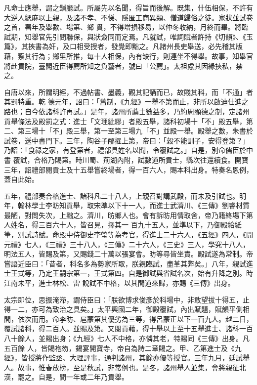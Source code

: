 \begin{pinyinscope}
 凡命士應舉，謂之鎖廳試。所屬先以名聞，得旨而後解。既集，什伍相保，不許有大逆人緦麻以上親，及諸不孝、不悌、隱匿工商異類、僧道歸俗之徒。家狀並試卷之首，署年及舉數、場第、鄉
 貫，不得增損移易，以仲冬收納，月終而畢。將臨試期，知舉官先引問聯保，與狀僉同而定焉。凡就試，唯詞賦者許持《切韻》、《玉篇》，其挾書為奸，及口相受授者，發覺即黜之。凡諸州長吏舉送，必先稽其版藉，察其行為；鄉里所推，每十人相保，內有缺行，則連坐不得舉。故事，知舉官將赴貢院，臺閣近臣得薦所知之負藝者，號曰「公薦」。太祖慮其因緣挾私，禁之。



 自唐以來，所謂明經，不過帖書、墨義，觀其記誦而已，故賤其科，而「不通」者其罰特重。乾
 德元年，詔曰：「舊制，《九經》一舉不第而止，非所以啟迪仕進之路也；自今依諸科許再試。」是年，諸州所薦士數益多，乃約周顯德之制，定諸州貢舉條法及殿罰之式：進士「文理紕繆」者殿五舉，諸科初場十「不」殿五舉，第二、第三場十「不」殿三舉，第一至第三場九「不」並殿一舉。殿舉之數，朱書於試卷，送中書門下。三年，陶谷子邴擢上第，帝曰：「穀不能訓子，安得登第？」乃詔：「食祿之家，有登第者，禮部具姓名以聞，令覆試之。」自是，別命儒臣於中書
 覆試，合格乃賜第。時川蜀、荊湖內附，試數道所貢士，縣次往還續食。開寶三年，詔禮部閱貢士及十五舉嘗終場者，得一百六人，賜本科出身。特奏名恩例，蓋自此始。



 五年，禮部奏合格進士、諸科凡二十八人，上親召對講武殿，而未及引試也。明年，翰林學士李昉知貢舉，取宋準以下十一人，而進士武濟川、《三傳》劉睿材質最陋，對問失次，上黜之。濟川，昉鄉人也。會有訴昉用情取舍，帝乃籍終場下第人姓名，得三百六十人，皆召見，擇其一
 百九十五人，並準以下，乃御殿給紙筆，別試詩賦。命殿中侍御史李瑩等為考官，得進士二十六人，《五經》四人，《開元禮》七人，《三禮》三十八人，《三傳》二十六人，《三史》三人，學究十八人，明法五人，皆賜及第，又賜錢二十萬以張宴會。昉等尋皆坐責。殿試遂為常制。帝嘗語近臣曰：「昔者，科名多為勢家所取，朕親臨試，盡革其弊矣。」八年，親試進士王式等，乃定王嗣宗第一，王式第四。自是御試與省試名次，始有升降之別。時江南未平，進士林松、雷
 說試不中格，以其間道來歸，亦賜《三傳》出身。



 太宗即位，思振淹滯，謂侍臣曰：「朕欲博求俊彥於科場中，非敢望拔十得五，止得一二，亦可為致治之具矣。」太平興國二年，御殿覆試，內出賦題，賦韻平側相間，依次而用。命李昉、扈蒙第其優劣為三等，得呂蒙正以下一百九人。越二日，覆試諸科，得二百人。並賜及第。又閱貢藉，得十舉以上至十五舉進士、諸科一百八十餘人，並賜出身；《九經》七人不中格，亦憐其老，特賜同《三傳》出身。凡五百餘
 人，皆賜袍笏，錫宴開寶寺，帝自為詩二章賜之。甲、乙第進士及《九經》，皆授將作監丞、大理評事，通判諸州，其餘亦優等授官。三年九月，廷試舉人。故事，惟春放榜，至是秋試，非常例也。是冬，諸州舉人並集，會將親征北漢，罷之。自是，間一年或二年乃貢舉。




\end{pinyinscope}
